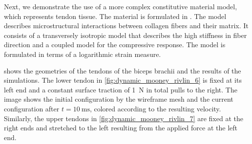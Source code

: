 Next, we demonstrate the use of a more complex constitutive material model, which represents tendon tissue. The material is formulated in \cite{Carniel2017}. The model describes microstructural interactions between collagen fibers and their matrix. It consists of a transversely isotropic model that describes the high stiffness in fiber direction and a coupled model for the compressive response. The model is formulated in terms of a logarithmic strain measure.


 shows the geometries of the tendons of the biceps brachii and the results of the simulations. The lower tendon in \cref{fig:dynamic_mooney_rivlin_6} is fixed at its left end and a constant surface traction of \SI{1}{\newton} in total pulls to the right. The image shows the initial configuration by the wireframe mesh and the current configuration after $t=\SI{10}{\ms}$, colored according to the resulting velocity.
Similarly, the upper tendons in \cref{fig:dynamic_mooney_rivlin_7} are fixed at the right ends and stretched to the left resulting from the applied force at the left end.

